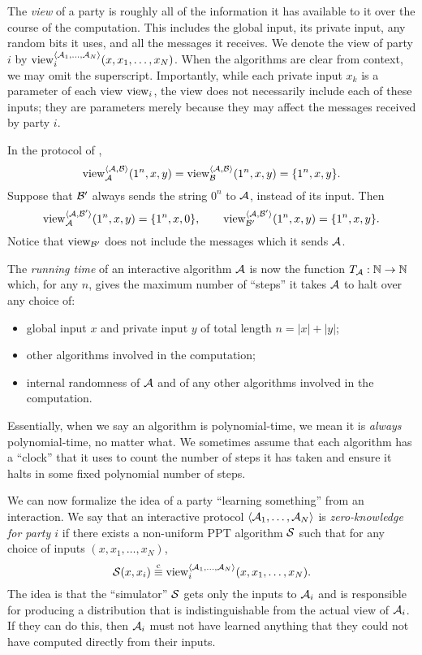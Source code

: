 The \emph{view} of a party is roughly all of the information it has available to
it over the course of the computation. This includes the global input, its
private input, any random bits it uses, and all the messages it receives. We
denote the view of party $i$ by $\operatorname{view}_i^{\langle\mathcal{A}_1, \dots, \mathcal{A}_N\rangle}(x, x_1,
\dots, x_N)$. When the algorithms are clear from context, we may omit the
superscript. Importantly, while each private input $x_k$ is a parameter of each
view $\operatorname{view}_i$, the view does not necessarily include each of these inputs; they
are parameters merely because they may affect the messages received by party
$i$.

\begin{ex}
  In the protocol of , \[
    \operatorname{view}_{\mathcal{A}}^{\langle\mathcal{A}, \mathcal{B}\rangle}(1^n, x, y) = \operatorname{view}_{\mathcal{B}}^{\langle\mathcal{A}, \mathcal{B}\rangle}(1^n, x, y) = \{1^n, x, y\}.
  \]
  Suppose that $\mathcal{B}'$ always sends the string $0^n$ to $\mathcal{A}$, instead of its input. Then \[
    \operatorname{view}_{\mathcal{A}}^{\langle\mathcal{A}, \mathcal{B}'\rangle}(1^n, x, y) = \{1^n, x, 0\},\quad\quad \operatorname{view}_{\mathcal{B}'}^{\langle\mathcal{A}, \mathcal{B}'\rangle}(1^n, x, y) = \{1^n, x, y\}.
  \]
  Notice that $\operatorname{view}_{\mathcal{B}'}$ does not include the messages which it sends $\mathcal{A}$.
\end{ex}


The \emph{running time} of an interactive algorithm $\mathcal{A}$ is now the function
$T_{\mathcal{A}}: \mathbb{N}\to\mathbb{N}$ which, for any $n$, gives the maximum number of ``steps'' it
takes $\mathcal{A}$ to halt over any choice of:
\begin{itemize}
  \item global input $x$ and private input $y$ of total length $n = |x| + |y|$;
  \item other algorithms involved in the computation;
  \item internal randomness of $\mathcal{A}$ and of any other algorithms involved in the computation.
\end{itemize}
Essentially, when we say an algorithm is polynomial-time, we mean it is
\emph{always} polynomial-time, no matter what. We sometimes assume that each
algorithm has a ``clock'' that it uses to count the number of steps it has taken
and ensure it halts in some fixed polynomial number of steps.

We can now formalize the idea of a party ``learning something'' from an
interaction. We say that an interactive protocol $\langle\mathcal{A}_1, \dots, \mathcal{A}_N\rangle$ is
\emph{zero-knowledge for party $i$} if there exists a non-uniform PPT algorithm
$\mathcal{S}$ such that for any choice of inputs $(x, x_1, \dots, x_N)$, \[
  \mathcal{S}(x, x_i) \overset{\text{c}}{\equiv} \operatorname{view}_i^{\langle\mathcal{A}_1, \dots, \mathcal{A}_N\rangle}(x, x_1, \dots, x_N).
\]
The idea is that the ``simulator'' $\mathcal{S}$ gets only the inputs to $\mathcal{A}_i$ and is
responsible for producing a distribution that is indistinguishable from the
actual view of $\mathcal{A}_i$. If they can do this, then $\mathcal{A}_i$ must not have learned
anything that they could not have computed directly from their inputs.

